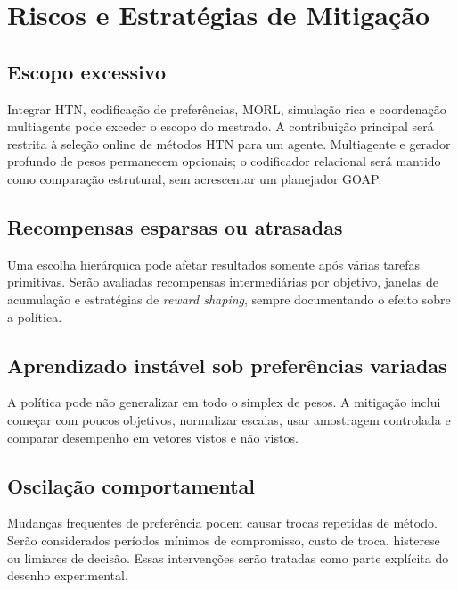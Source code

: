 \chapter{Riscos e Estratégias de Mitigação}

\section{Escopo excessivo}

Integrar HTN, codificação de preferências, MORL, simulação rica e coordenação
multiagente pode exceder o escopo do mestrado.
A contribuição principal será restrita à seleção online de métodos HTN para um
agente.
Multiagente e gerador profundo de pesos permanecem opcionais; o codificador
relacional será mantido como comparação estrutural, sem acrescentar um
planejador GOAP.

\section{Recompensas esparsas ou atrasadas}

Uma escolha hierárquica pode afetar resultados somente após várias tarefas
primitivas.
Serão avaliadas recompensas intermediárias por objetivo, janelas de acumulação
e estratégias de \textit{reward shaping}, sempre documentando o efeito sobre a
política.

\section{Aprendizado instável sob preferências variadas}

A política pode não generalizar em todo o simplex de pesos.
A mitigação inclui começar com poucos objetivos, normalizar escalas, usar
amostragem controlada e comparar desempenho em vetores vistos e não vistos.

\section{Oscilação comportamental}

Mudanças frequentes de preferência podem causar trocas repetidas de método.
Serão considerados períodos mínimos de compromisso, custo de troca, histerese
ou limiares de decisão.
Essas intervenções serão tratadas como parte explícita do desenho experimental.


